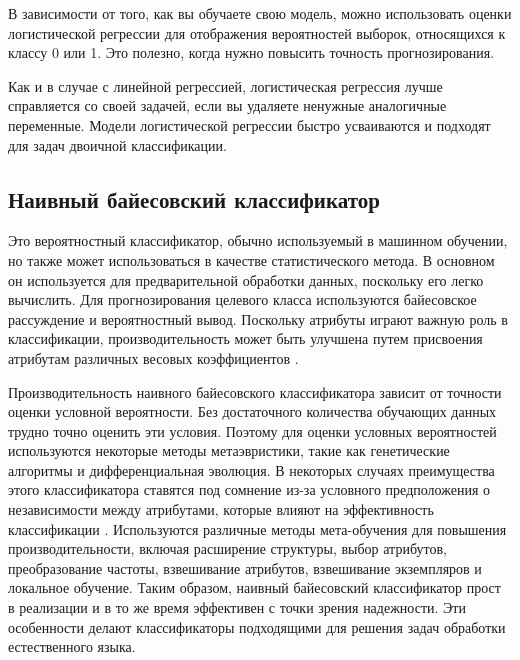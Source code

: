 В зависимости от того, как вы обучаете свою модель, можно использовать оценки логистической регрессии для отображения вероятностей выборок, относящихся к классу 0 или 1. Это полезно, когда нужно повысить точность прогнозирования.

Как и в случае с линейной регрессией, логистическая регрессия лучше справляется со своей задачей, если вы удаляете ненужные аналогичные переменные. Модели логистической регрессии быстро усваиваются и подходят для задач двоичной классификации.

\subsection{Наивный байесовский классификатор}

Это вероятностный классификатор, обычно используемый в машинном обучении, но также может использоваться в качестве статистического метода. В основном он используется для предварительной обработки данных, поскольку его легко вычислить. Для прогнозирования целевого класса используются байесовское рассуждение и вероятностный вывод. Поскольку атрибуты играют важную роль в классификации, производительность может быть улучшена путем присвоения атрибутам различных весовых коэффициентов \cite{11}.

Производительность наивного байесовского классификатора зависит от точности оценки условной вероятности. Без достаточного количества обучающих данных трудно точно оценить эти условия. Поэтому для оценки условных вероятностей используются некоторые методы метаэвристики, такие как генетические алгоритмы и дифференциальная эволюция. В некоторых случаях преимущества этого классификатора ставятся под сомнение из-за условного предположения о независимости между атрибутами, которые влияют на эффективность классификации \cite{11}. Используются различные методы мета-обучения для повышения производительности, включая расширение структуры, выбор атрибутов, преобразование частоты, взвешивание атрибутов, взвешивание экземпляров и локальное обучение. Таким образом, наивный байесовский классификатор прост в реализации и в то же время эффективен с точки зрения надежности. Эти особенности делают классификаторы подходящими для решения задач обработки естественного языка.

